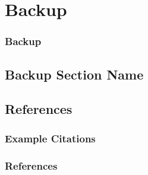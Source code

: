 \backupbegin

\section*{Backup}

\begin{frame}\frametitle{Backup}
\end{frame}

\subsection*{Backup Section Name}




\subsection*{References}

\begin{frame}\frametitle{Example Citations}
\cite{knacke1968apollo}
\cite{mckinney2013boeing}
\cite{adams2009mars}
\cite{ray2015pendulum}
\cite{ali2017orion}
\cite{anderson2017subscale}

\end{frame}

\begin{frame}[allowframebreaks]\frametitle{References}
\end{frame}


\backupend



